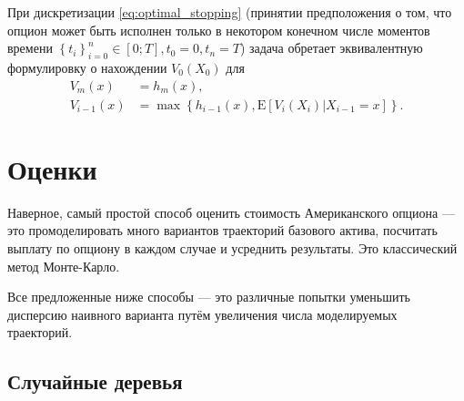 \documentclass[specialist,
               substylefile = ../spbu.rtx,
               subf,href,colorlinks=true, 10pt]{disser}
\newcommand{\E}{\mathrm{E}}
\begin{document}
При дискретизации \eqref{eq:optimal_stopping} (принятии предположения о том, что опцион может быть исполнен только в некотором конечном числе моментов времени $\left\lbrace t_i\right\rbrace_{i=0}^n \in \left[0;T\right], t_0 = 0, t_n = T$) задача обретает эквивалентную формулировку о нахождении $V_0\left(X_0\right)$ для
\begin{equation}\label{eq:option-recursive}\begin{aligned}
			V_m\left(x\right) &= h_m\left(x\right), \\
			V_{i-1}\left(x\right) &= \max\left\lbrace h_{i-1}\left(x\right), \E\left[V_i\left(X_i\right)|X_{i-1}=x\right]\right\rbrace.
\end{aligned}\end{equation}


\section{Оценки} %
\label{sec:estimators}

Наверное, самый простой способ оценить стоимость Американского опциона --- это промоделировать много вариантов траекторий базового актива, посчитать выплату по опциону в каждом случае и усреднить результаты. Это классический метод Монте-Карло.

Все предложенные ниже способы --- это различные попытки уменьшить дисперсию наивного варианта путём увеличения числа моделируемых траекторий. 

\subsection{Случайные деревья} %
\label{sub:tree_estimator}
\end{document}
